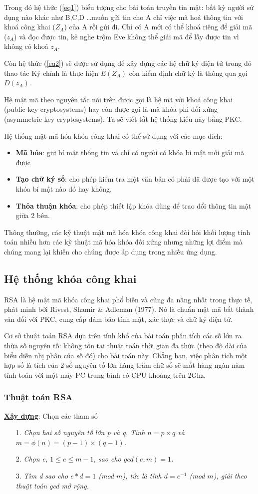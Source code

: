 \documentclass[a4paper,12pt]{report}
\begin{document}
Trong đó hệ thức (\ref{eq1}) biểu tượng cho bài toán truyền tin mật: bất kỳ người sử dụng nào khác như B,C,D \ldots muốn gửi tin cho A chỉ việc mã hoá thông tin với khoá công khai ($Z_A$) của A rồi gửi đi. Chỉ có A mới có thể khoá riêng để giải mã ($z_A$) và đọc được tin, kẻ nghe trộm Eve không thể giải mã để lấy được tin vì không có khoá $z_A$.

Còn hệ thức (\ref{eq2}) sẽ được sử dụng để xây dựng các hệ chữ ký điện tử trong đó thao tác Ký chính là thực hiện $E(Z_A)$ còn kiểm định chữ ký là thông qua gọi $D(z_A)$.

Hệ mật mã theo nguyên tắc nói trên được gọi là hệ mã với khoá công khai (public key cryptosystems) hay còn được gọi là mã khóa phi đối xứng (asymmetric key cryptosystems). Ta sẽ viết tắt hệ thống kiểu này bằng PKC.

Hệ thống mật mã hóa khóa công khai có thể sử dụng với các mục đích:
\begin{itemize}
\item \textbf{Mã hóa}: giữ bí mật thông tin và chỉ có người có khóa bí mật mới giải mã được
\item \textbf{Tạo chữ ký số}: cho phép kiểm tra một văn bản có phải đã được tạo với một khóa bí mật nào đó hay không.
\item \textbf{Thỏa thuận khóa}: cho phép thiết lập khóa dùng để trao đổi thông tin mật giữa 2 bên.
\end{itemize}

Thông thường, các kỹ thuật mật mã hóa khóa công khai đòi hỏi khối lượng tính toán nhiều hơn các kỹ thuật mã hóa khóa đối xứng nhưng những lợi điểm mà chúng mang lại khiến cho chúng được áp dụng trong nhiều ứng dụng.
\subsection*{Hệ thống khóa công khai}
RSA là hệ mật mã khóa công khai phổ biến và cũng đa năng nhất trong thực tế,
phát minh bởi Rivest, Shamir \& Adleman (1977). Nó là chuẩn mật mã bất thành văn đối với PKC, cung cấp đảm bảo tính mật, xác thực và chữ ký điện tử.

Cơ sở thuật toán RSA dựa trên tính khó của bài toán phân tích các số lớn ra thừa số nguyên tố: không tồn tại thuật toán thời gian đa thức (theo độ dài của biểu diễn nhị phân của số đó) cho bài toán này. Chẳng hạn, việc phân tích một hợp số là tích của 2 số nguyên tố lớn hàng trăm chữ số sẽ mất hàng ngàn năm tính toán với một máy PC trung bình có CPU khoảng trên 2Ghz.
\subsubsection{Thuật toán RSA}
\textbf{\underline{Xây dựng}}: Chọn các tham số
\begin{itemize}
\item[1. ] \textit{Chọn hai số nguyên tố lớn p và q. Tính $n = p \times q$ và $m = \phi(n) = (p - 1) \times (q - 1)$.}
\item[2. ] \textit{Chọn e, $1 \leq e \leq m -1$, sao cho $gcd(e, m) = 1$.}
\item[3. ] \textit{Tìm d sao cho $e * d = 1$ (mod $m$), tức là tính $d = e^{-1}$
(mod $m$), giải theo thuật toán gcd mở rộng.}
\end{itemize}
\end{document}

